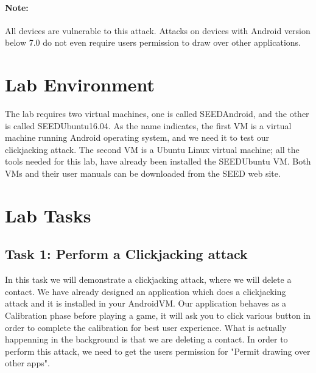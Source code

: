 \paragraph{Note:} All devices are vulnerable to this attack. Attacks on devices with Android version below 7.0 do not even require users permission to draw over other applications. 



\section{Lab Environment}

The lab requires two virtual machines, one is called SEEDAndroid, and the other is called
SEEDUbuntu16.04. As the name indicates, the first VM is a virtual machine running Android
operating system, and we need it to test our clickjacking attack. The second
VM is a Ubuntu Linux virtual machine; all the tools needed for
this lab, have already been installed the SEEDUbuntu VM. 
Both VMs and their user manuals can be downloaded from the SEED web site. 



\section{Lab Tasks}



\subsection{Task 1: Perform a Clickjacking attack}


In this task we will demonstrate a clickjacking attack, where we will delete a contact. We have already designed an
application which does a clickjacking attack and it is installed in your AndroidVM.
Our application behaves as a Calibration phase before playing a game, it will ask you to click various button in order to complete the 
calibration for best user experience. What is actually happenning in the background is that we are deleting a contact. In order to perform
this attack, we need to get the users permission for "Permit drawing over other apps". 

